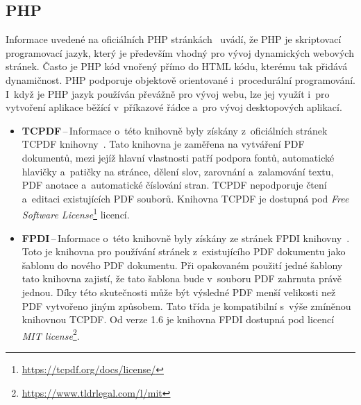 \subsection*{PHP}

Informace uvedené na oficiálních PHP stránkách~\cite{PHP_is, PHP_can_do} uvádí,
že PHP je skriptovací programovací jazyk, který je především vhodný pro vývoj
dynamických webových stránek. Často je PHP kód vnořený přímo do HTML kódu, kterému
tak přidává dynamičnost. PHP podporuje objektově orientované i~procedurální 
programování. I~když je PHP jazyk používán převážně pro vývoj webu, lze jej využít
i~pro vytvoření aplikace běžící v~příkazové řádce a~pro vývoj
desktopových aplikací.

\begin{itemize}
    \item \textbf{TCPDF}\,--\,Informace o~této knihovně byly získány
    z~oficiálních stránek TCPDF kni\-hov\-ny~\cite{TCPDF}.
    Tato knihovna je zaměřena na vytváření PDF dokumentů, mezi jejíž hlavní
    vlastnosti patří podpora fontů, automatické hlavičky a~patičky na stránce,
    dělení slov, zarovnání a~zalamování textu, PDF anotace a~automatické číslování
    stran. TCPDF nepodporuje čtení a~editaci existujících PDF souborů.
    Knihovna TCPDF je dostupná pod \emph{Free Software License}\footnote{
    \href{https://tcpdf.org/docs/license/}{https://tcpdf.org/docs/license/}
    } licencí.

    

    \item \textbf{FPDI}\,--\,Informace o~této knihovně byly získány
    ze stránek FPDI kni\-hov\-ny~\cite{FPDI}.
    Toto je knihovna pro používání stránek z~existujícího PDF dokumentu jako
    šablonu do nového PDF dokumentu. Při opakovaném použití jedné šablony tato 
    knihovna zajistí, že tato šablona bude v~souboru PDF zahrnuta právě jednou. Díky
    této skutečnosti může být výsledné PDF menší velikosti než PDF vytvořeno jiným
    způsobem. Tato třída je kompatibilní s~výše zmíněnou knihovnou TCPDF. Od verze
    1.6 je knihovna FPDI dostupná pod licencí \emph{MIT license}\footnote{
    \href{https://www.tldrlegal.com/l/mit}{https://www.tldrlegal.com/l/mit}
    }.

\end{itemize}


